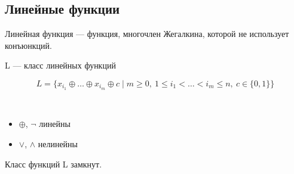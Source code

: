 \subsection{Линейные функции}

\begin{defn}
    Линейная функция --- функция, многочлен Жегалкина, которой не использует конъюнкций.
\end{defn}

\begin{theorem-non}
    L --- класс линейных функций
\end{theorem-non}

\[ L = \{x_{i_1} \oplus \ldots \oplus x_{i_m} \oplus c \mid m \geq 0,\ 1 \leq i_1 < \ldots < i_m \leq n, \ c \in \{0, 1\} \} \]

\begin{examples}~
    \begin{itemize}
        \item $\oplus$, $\neg$ линейны
        \item $\vee$, $\wedge$ нелинейны
    \end{itemize}
\end{examples}

\begin{theorem-non}
    Класс функций L замкнут.
\end{theorem-non}
